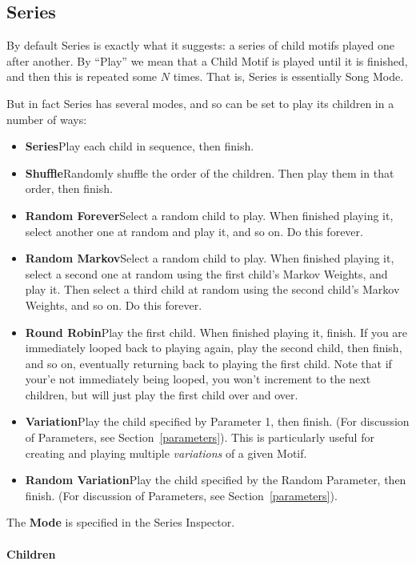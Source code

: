 \documentclass[twoside,10pt]{article}
\begin{document}
\clearpage\subsection{Series}

By default Series is exactly what it suggests: a series of child motifs played one after another.   By ``Play'' we mean that a Child Motif is played until it is finished, and then this is repeated some \(N\) times.  That is, Series is essentially Song Mode.  

But in fact Series has several modes, and so can be set to play its children in a number of ways:

\begin{itemize}
\item{\bf Series}\quad Play each child in sequence, then finish.
\item{\bf Shuffle}\quad Randomly shuffle the order of the children.  Then play them in that order, then finish.
\item{\bf Random Forever}\quad Select a random child to play.  When finished playing it, select another one at random and play it, and so on.  Do this forever.  
\item{\bf Random Markov}\quad Select a random child to play.  When finished playing it, select a second one at random using the first child's Markov Weights, and play it.  Then select a third child at random using the second child's Markov Weights, and so on.  Do this forever.
\item{\bf Round Robin}\quad Play the first child.  When finished playing it, finish.  If you are immediately looped back to playing again, play the second child, then finish, and so on, eventually returning back to playing the first child.  Note that if your'e not immediately being looped, you won't increment to the next children, but will just play the first child over and over.
\item{\bf Variation}\quad Play the child specified by Parameter 1, then finish. (For discussion of Parameters, see Section~\ref{parameters}).  This is particularly useful for creating and playing multiple {\it variations} of a given Motif.
\item{\bf Random Variation}\quad Play the child specified by the Random Parameter, then finish. (For discussion of Parameters, see Section~\ref{parameters}).
\end{itemize}

The {\bf Mode} is specified in the Series Inspector.

\paragraph{Children}
\end{document}

